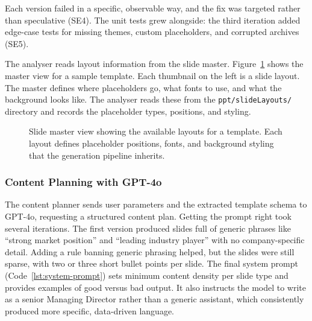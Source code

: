 Each version failed in a specific, observable way, and the fix was targeted rather than speculative (SE4). The unit tests grew alongside: the third iteration added edge-case tests for missing themes, custom placeholders, and corrupted archives (SE5).

The analyser reads layout information from the slide master. Figure~\ref{fig:template-master} shows the master view for a sample template. Each thumbnail on the left is a slide layout. The master defines where placeholders go, what fonts to use, and what the background looks like. The analyser reads these from the \texttt{ppt/slideLayouts/} directory and records the placeholder types, positions, and styling.

\begin{figure}[H]
  \centering
  \caption{Slide master view showing the available layouts for a template. Each layout defines placeholder positions, fonts, and background styling that the generation pipeline inherits.}
  \label{fig:template-master}
\end{figure}

\subsubsection{Content Planning with GPT-4o}

The content planner sends user parameters and the extracted template schema to GPT-4o, requesting a structured content plan. Getting the prompt right took several iterations. The first version produced slides full of generic phrases like ``strong market position'' and ``leading industry player'' with no company-specific detail. Adding a rule banning generic phrasing helped, but the slides were still sparse, with two or three short bullet points per slide. The final system prompt (Code~\ref{lst:system-prompt}) sets minimum content density per slide type and provides examples of good versus bad output. It also instructs the model to write as a senior Managing Director rather than a generic assistant, which consistently produced more specific, data-driven language.

